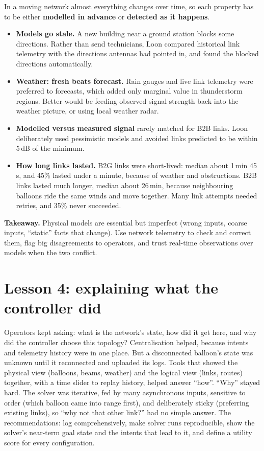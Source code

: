 In a moving network almost everything changes over time, so each property has to be either \textbf{modelled in advance} or \textbf{detected as it happens}.
\begin{itemize}
  \item \textbf{Models go stale.} A new building near a ground station blocks some directions. Rather than send technicians, Loon compared historical link telemetry with the
        directions antennas had pointed in, and found the blocked directions automatically.
  \item \textbf{Weather: fresh beats forecast.} Rain gauges and live link telemetry were preferred to forecasts, which added only marginal value in thunderstorm regions. Better
        would be feeding observed signal strength back into the weather picture, or using local weather radar.
  \item \textbf{Modelled versus measured signal} rarely matched for B2B links. Loon deliberately used pessimistic models and avoided links predicted to be within 5\,dB of the minimum.
  \item \textbf{How long links lasted.} B2G links were short-lived: median about 1\,min 45\,s, and 45\% lasted under a minute, because of weather and obstructions. B2B links
        lasted much longer, median about 26\,min, because neighbouring balloons ride the same winds and move together. Many link attempts needed retries, and 35\% never succeeded.
\end{itemize}
\textbf{Takeaway.} Physical models are essential but imperfect (wrong inputs, coarse inputs, ``static'' facts that change). Use network telemetry to check and correct
them, flag big disagreements to operators, and trust real-time observations over models when the two conflict.

\section{Lesson 4: explaining what the controller did}
Operators kept asking: what is the network's state, how did it get here, and why did the controller choose this topology? Centralisation helped, because intents and telemetry
history were in one place. But a disconnected balloon's state was unknown until it reconnected and uploaded its logs. Tools that showed the physical view (balloons, beams,
weather) and the logical view (links, routes) together, with a time slider to replay history, helped answer ``how''. ``Why'' stayed hard. The solver was iterative, fed by many
asynchronous inputs, sensitive to order (which balloon came into range first), and deliberately sticky (preferring existing links), so ``why not that other link?'' had no
simple answer. The recommendations: log comprehensively, make solver runs reproducible, show the solver's near-term goal state and the intents that lead to it, and define
a utility score for every configuration.

